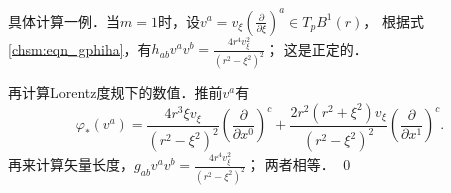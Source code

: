 
\begin{example}
    具体计算一例．当$m=1$时，设$v^a=v_{\xi}(\frac{\partial}{\partial \xi})^a\in T_pB^1(r)$，
    根据式\eqref{chsm:eqn_gphiha}，有$h_{ab}v^a v^b= \frac{4r^4 v^2_\xi}{(r^2-\xi^2)^2}$；
    这是正定的．
    
    再计算Lorentz度规下的数值．推前$v^a$有
    \begin{equation*}
    	\varphi_*(v^a)= \frac{4r^3\xi v_\xi}{(r^2-\xi^2)^2}
    	\left(\frac{\partial}{\partial x^0}\right)^c
    	+ \frac{2r^2(r^2+\xi^2) v_\xi}{(r^2-\xi^2)^2}
    	\left(\frac{\partial}{\partial x^1}\right)^c.
    \end{equation*}    
    再来计算矢量长度，$g_{ab}v^a v^b= \frac{4r^4 v^2_\xi}{(r^2-\xi^2)^2}$；
    两者相等．   \qed
\end{example}



